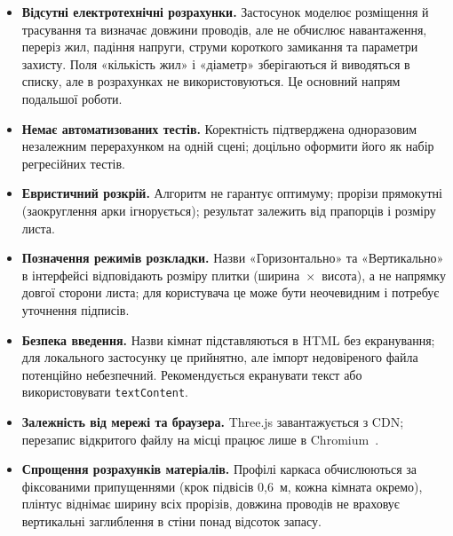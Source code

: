 \begin{itemize}[noitemsep, topsep=0.3em, leftmargin=*]
    \item \textbf{Відсутні електротехнічні розрахунки.} Застосунок моделює розміщення й трасування та визначає довжини проводів, але не обчислює навантаження, переріз жил, падіння напруги, струми короткого замикання та параметри захисту. Поля «кількість жил» і «діаметр» зберігаються й виводяться в списку, але в розрахунках не використовуються. Це основний напрям подальшої роботи.
    \item \textbf{Немає автоматизованих тестів.} Коректність підтверджена одноразовим незалежним перерахунком на одній сцені; доцільно оформити його як набір регресійних тестів.
    \item \textbf{Евристичний розкрій.} Алгоритм не гарантує оптимуму; прорізи прямокутні (заокруглення арки ігнорується); результат залежить від прапорців і розміру листа.
    \item \textbf{Позначення режимів розкладки.} Назви «Горизонтально» та «Вертикально» в інтерфейсі відповідають розміру плитки (ширина~$\times$~висота), а не напрямку довгої сторони листа; для користувача це може бути неочевидним і потребує уточнення підписів.
    \item \textbf{Безпека введення.} Назви кімнат підставляються в HTML без екранування; для локального застосунку це прийнятно, але імпорт недовіреного файла потенційно небезпечний. Рекомендується екранувати текст або використовувати \texttt{textContent}.
    \item \textbf{Залежність від мережі та браузера.} Three.js завантажується з CDN; перезапис відкритого файлу на місці працює лише в Chromium~.
    \item \textbf{Спрощення розрахунків матеріалів.} Профілі каркаса обчислюються за фіксованими припущеннями (крок підвісів 0,6~м, кожна кімната окремо), плінтус віднімає ширину всіх прорізів, довжина проводів не враховує вертикальні заглиблення в стіни понад відсоток запасу.
\end{itemize}


